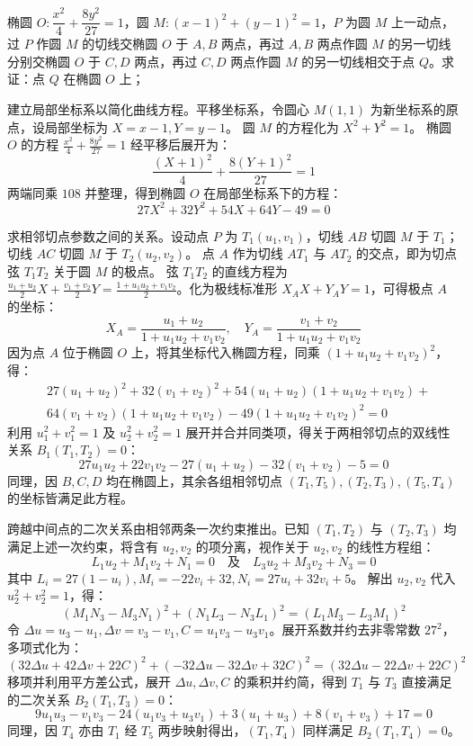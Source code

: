 \begin{exercise}
椭圆 \( O: \dfrac{x^2}{4} + \dfrac{8y^2}{27} = 1 \)，圆 \( M: (x-1)^2 + (y-1)^2 = 1 \)，\( P \) 为圆 \( M \) 上一动点，过 \( P \) 作圆 \( M \) 的切线交椭圆 \( O \) 于 \( A,B \) 两点，再过 \( A,B \) 两点作圆 \( M \) 的另一切线分别交椭圆 \( O \) 于 \( C,D \) 两点，再过 \( C,D \) 两点作圆 \( M \) 的另一切线相交于点 \( Q \)。求证：点 \( Q \) 在椭圆 \( O \) 上；
\end{exercise}
\begin{solution}
建立局部坐标系以简化曲线方程。平移坐标系，令圆心 $M(1,1)$ 为新坐标系的原点，设局部坐标为 $X = x-1, Y = y-1$。
圆 $M$ 的方程化为 $X^2 + Y^2 = 1$。
椭圆 $O$ 的方程 $\frac{x^2}{4} + \frac{8y^2}{27} = 1$ 经平移后展开为：
$$ \frac{(X+1)^2}{4} + \frac{8(Y+1)^2}{27} = 1 $$
两端同乘 $108$ 并整理，得到椭圆 $O$ 在局部坐标系下的方程：
$$ 27X^2 + 32Y^2 + 54X + 64Y - 49 = 0 $$

求相邻切点参数之间的关系。设动点 $P$ 为 $T_1(u_1, v_1)$，切线 $AB$ 切圆 $M$ 于 $T_1$；切线 $AC$ 切圆 $M$ 于 $T_2(u_2, v_2)$。
点 $A$ 作为切线 $AT_1$ 与 $AT_2$ 的交点，即为切点弦 $T_1 T_2$ 关于圆 $M$ 的极点。
弦 $T_1 T_2$ 的直线方程为 $\frac{u_1+u_2}{2}X + \frac{v_1+v_2}{2}Y = \frac{1+u_1 u_2 + v_1 v_2}{2}$。化为极线标准形 $X_A X + Y_A Y = 1$，可得极点 $A$ 的坐标：
$$ X_A = \frac{u_1+u_2}{1+u_1 u_2 + v_1 v_2}, \quad Y_A = \frac{v_1+v_2}{1+u_1 u_2 + v_1 v_2} $$
因为点 $A$ 位于椭圆 $O$ 上，将其坐标代入椭圆方程，同乘 $(1+u_1 u_2 + v_1 v_2)^2$，得：
\begin{align*}
     &27(u_1+u_2)^2 + 32(v_1+v_2)^2 + 54(u_1+u_2)(1+u_1 u_2 + v_1 v_2) +\\
 &64(v_1+v_2)(1+u_1 u_2 + v_1 v_2) - 49(1+u_1 u_2 + v_1 v_2)^2 = 0 \end{align*}
利用 $u_1^2+v_1^2=1$ 及 $u_2^2+v_2^2=1$ 展开并合并同类项，得关于两相邻切点的双线性关系 $B_1(T_1, T_2) = 0$：
$$ 27 u_1 u_2 + 22 v_1 v_2 - 27(u_1+u_2) - 32(v_1+v_2) - 5 = 0 $$
同理，因 $B, C, D$ 均在椭圆上，其余各组相邻切点 $(T_1, T_5), (T_2, T_3), (T_5, T_4)$ 的坐标皆满足此方程。

跨越中间点的二次关系由相邻两条一次约束推出。已知 $(T_1, T_2)$ 与 $(T_2, T_3)$ 均满足上述一次约束，将含有 $u_2, v_2$ 的项分离，视作关于 $u_2, v_2$ 的线性方程组：
$$ L_1 u_2 + M_1 v_2 + N_1 = 0 \quad \text{及} \quad L_3 u_2 + M_3 v_2 + N_3 = 0 $$
其中 $L_i = 27(1-u_i), M_i = -22v_i+32, N_i = 27u_i+32v_i+5$。
解出 $u_2, v_2$ 代入 $u_2^2 + v_2^2 = 1$，得：
$$ (M_1 N_3 - M_3 N_1)^2 + (N_1 L_3 - N_3 L_1)^2 = (L_1 M_3 - L_3 M_1)^2 $$
令 $\Delta u = u_3-u_1, \Delta v = v_3-v_1, C = u_1 v_3 - u_3 v_1$。展开系数并约去非零常数 $27^2$，多项式化为：
$$ (32 \Delta u + 42 \Delta v + 22 C)^2 + (-32 \Delta u - 32 \Delta v + 32 C)^2 = (32 \Delta u - 22 \Delta v + 22 C)^2 $$
移项并利用平方差公式，展开 $\Delta u, \Delta v, C$ 的乘积并约简，得到 $T_1$ 与 $T_3$ 直接满足的二次关系 $B_2(T_1, T_3) = 0$：
$$ 9 u_1 u_3 - v_1 v_3 - 24(u_1 v_3 + u_3 v_1) + 3(u_1+u_3) + 8(v_1+v_3) + 17 = 0 $$
同理，因 $T_4$ 亦由 $T_1$ 经 $T_5$ 两步映射得出，$(T_1, T_4)$ 同样满足 $B_2(T_1, T_4) = 0$。


\end{solution}
